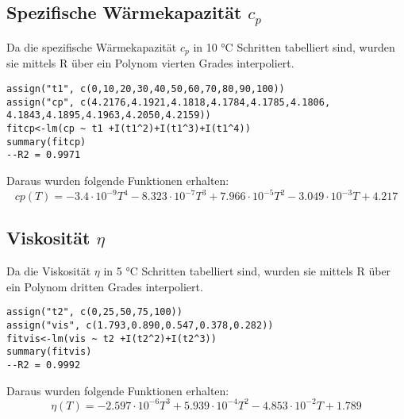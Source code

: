\documentclass[12pt]{article}
\begin{document}
\subsection{Spezifische Wärmekapazität $c _p$}
Da die spezifische Wärmekapazität $c _p$ \cite{crc1} in 10 \si{\celsius} Schritten
tabelliert sind, wurden sie mittels R über ein Polynom vierten Grades interpoliert.
\lstset{ basicstyle=\small, stringstyle=\ttfamily}
\begin{lstlisting}
assign("t1", c(0,10,20,30,40,50,60,70,80,90,100))
assign("cp", c(4.2176,4.1921,4.1818,4.1784,4.1785,4.1806,
4.1843,4.1895,4.1963,4.2050,4.2159))
fitcp<-lm(cp ~ t1 +I(t1^2)+I(t1^3)+I(t1^4))
summary(fitcp)
--R2 = 0.9971
\end{lstlisting}

Daraus wurden folgende Funktionen erhalten:
\begin{equation}
 cp (T) = -3.4 \cdot 10^{-9} T ^4 -8.323 \cdot 10^{-7} T ^ 3 + 7.966 \cdot 10^{-5} T ^ 2 - 3.049 \cdot 10^{-3} T + 4.217
\end{equation}
\subsection{Viskosität $\eta$}
Da die Viskosität $\eta$ \cite{crc2} in 5 \si{\celsius} Schritten
tabelliert sind, wurden sie mittels R über ein Polynom dritten Grades interpoliert.
\begin{verbatim}
assign("t2", c(0,25,50,75,100))
assign("vis", c(1.793,0.890,0.547,0.378,0.282))
fitvis<-lm(vis ~ t2 +I(t2^2)+I(t2^3))
summary(fitvis)
--R2 = 0.9992
\end{verbatim}
Daraus wurden folgende Funktionen erhalten:
\begin{equation}
 \eta (T) = -2.597 \cdot 10^{-6} T ^ 3 + 5.939 \cdot 10^{-4} T ^ 2 - 4.853 \cdot 10^{-2} T + 1.789
\end{equation}
\end{document}
